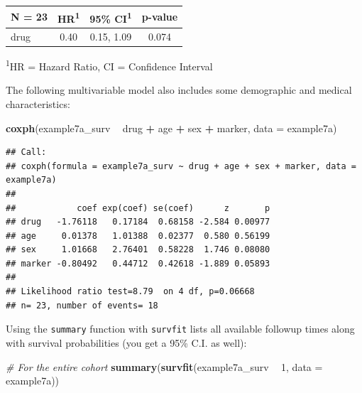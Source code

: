 \documentclass[]{book}
\newenvironment{Shaded}{\begin{snugshade}}{\end{snugshade}}
\newcommand{\CommentTok}[1]{\textcolor[rgb]{0.56,0.35,0.01}{\textit{#1}}}
\newcommand{\DataTypeTok}[1]{\textcolor[rgb]{0.13,0.29,0.53}{#1}}
\newcommand{\DecValTok}[1]{\textcolor[rgb]{0.00,0.00,0.81}{#1}}
\newcommand{\KeywordTok}[1]{\textcolor[rgb]{0.13,0.29,0.53}{\textbf{#1}}}
\newcommand{\NormalTok}[1]{#1}
\newcommand{\OperatorTok}[1]{\textcolor[rgb]{0.81,0.36,0.00}{\textbf{#1}}}
\newcommand{\StringTok}[1]{\textcolor[rgb]{0.31,0.60,0.02}{#1}}
\begin{document}
\captionsetup[table]{labelformat=empty,skip=1pt}
\begin{longtable}{lccc}
\toprule
\textbf{N = 23} & \textbf{HR}\textsuperscript{1} & \textbf{95\% CI}\textsuperscript{1} & \textbf{p-value} \\ 
\midrule
drug & 0.40 & 0.15, 1.09 & 0.074 \\ 
\bottomrule
\end{longtable}
\vspace{-5mm}
\begin{minipage}{\linewidth}
\textsuperscript{1}HR = Hazard Ratio, CI = Confidence Interval \\ 
\end{minipage}

The following multivariable model also includes some demographic and medical characteristics:

\begin{Shaded}
\begin{Highlighting}[]
\KeywordTok{coxph}\NormalTok{(example7a_surv }\OperatorTok{~}\StringTok{ }\NormalTok{drug }\OperatorTok{+}\StringTok{ }\NormalTok{age }\OperatorTok{+}\StringTok{ }\NormalTok{sex }\OperatorTok{+}\StringTok{ }\NormalTok{marker, }\DataTypeTok{data =}\NormalTok{ example7a)}
\end{Highlighting}
\end{Shaded}

\begin{verbatim}
## Call:
## coxph(formula = example7a_surv ~ drug + age + sex + marker, data = example7a)
## 
##            coef exp(coef) se(coef)      z       p
## drug   -1.76118   0.17184  0.68158 -2.584 0.00977
## age     0.01378   1.01388  0.02377  0.580 0.56199
## sex     1.01668   2.76401  0.58228  1.746 0.08080
## marker -0.80492   0.44712  0.42618 -1.889 0.05893
## 
## Likelihood ratio test=8.79  on 4 df, p=0.06668
## n= 23, number of events= 18
\end{verbatim}

Using the \texttt{summary} function with \texttt{survfit} lists all available followup times along with survival probabilities (you get a 95\% C.I. as well):

\begin{Shaded}
\begin{Highlighting}[]
\CommentTok{# For the entire cohort}
\KeywordTok{summary}\NormalTok{(}\KeywordTok{survfit}\NormalTok{(example7a_surv }\OperatorTok{~}\StringTok{ }\DecValTok{1}\NormalTok{, }\DataTypeTok{data =}\NormalTok{ example7a))}
\end{Highlighting}
\end{Shaded}
\end{document}
